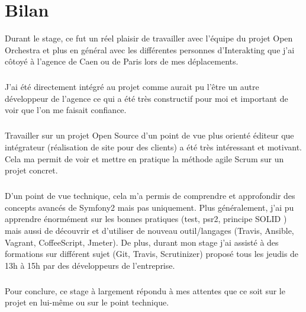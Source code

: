 \chapter*{Bilan}
Durant le stage, ce fut un réel plaisir de travailler avec l'équipe du projet Open Orchestra et plus en général avec les différentes personnes d'Interakting que j'ai côtoyé à l'agence de Caen ou de Paris lors de mes déplacements.
\paragraph{}
J'ai été directement intégré au projet comme aurait pu l'être un autre développeur de l'agence ce qui a été très constructif pour moi et important de voir que l'on me faisait confiance.
\paragraph{}
Travailler sur un projet Open Source d'un point de vue plus orienté éditeur que intégrateur (réalisation de site pour des clients) a été très intéressant et motivant.  Cela ma permit de voir et mettre en pratique la méthode agile Scrum sur un projet concret.
\paragraph{}
D'un point de vue technique, cela m'a permis de comprendre et approfondir des concepts avancés de Symfony2 mais pas uniquement. Plus généralement, j'ai pu apprendre énormément sur les bonnes pratiques (test, psr2, principe SOLID 
) mais aussi de découvrir et d'utiliser de nouveau outil/langages (Travis, Ansible, Vagrant, CoffeeScript, Jmeter). 
De plus, durant mon stage j'ai assisté à des formations sur différent sujet (Git, Travis, Scrutinizer) proposé tous les jeudis de 13h à 15h par des développeurs de l'entreprise.
\paragraph{}
Pour conclure, ce stage à largement répondu à mes attentes que ce soit sur le projet en lui-même ou sur le point technique.